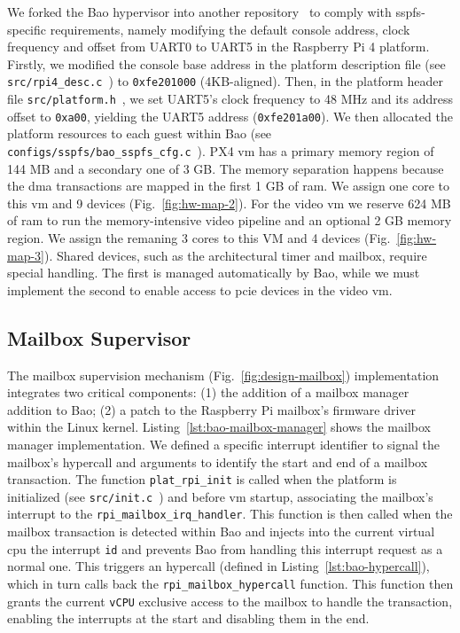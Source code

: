 We forked the Bao hypervisor into another repository~\cite{baoRepo-mine} to comply with
\gls{sspfs}-specific requirements, namely modifying the default console address,
clock frequency and offset from UART0 to UART5 in the Raspberry Pi 4 platform.
Firstly, we modified the console base address in the platform description file
(see \lstinline{src/rpi4_desc.c}~\cite{thesis-sw-github}) to
\lstinline{0xfe201000} (4KB-aligned). Then, in the platform header file \lstinline{src/platform.h}~\cite{thesis-sw-github}, we set UART5's clock frequency to 48
MHz and its address offset to \lstinline{0xa00}, yielding the UART5 address
(\lstinline{0xfe201a00}).
We then allocated the platform resources to each guest within Bao (see
\lstinline{configs/sspfs/bao_sspfs_cfg.c}~\cite{thesis-sw-github}). PX4 \gls{vm}
has a primary memory region of 144 MB and a secondary one of 3 GB. The memory
separation happens because the \gls{dma} transactions are mapped in the first 1
GB of \gls{ram}. We assign one core to this \gls{vm} and 9 devices
(Fig.~\ref{fig:hw-map-2}). For the video \gls{vm} we reserve 624 MB of \gls{ram}
to run the memory-intensive video pipeline and an optional 2 GB memory
region. We assign the remaning 3 cores to this VM and 4 devices
(Fig.~\ref{fig:hw-map-3}).
Shared devices, such as the architectural timer and mailbox, require special
handling. The first is managed automatically by Bao, while we must implement the
second to enable access to \gls{pcie} devices in the video \gls{vm}.

\subsection{Mailbox Supervisor}
The mailbox supervision mechanism (Fig.~\ref{fig:design-mailbox}) implementation
integrates two critical components: (1) the addition of a mailbox manager
addition to Bao; (2) a patch to the Raspberry Pi mailbox's firmware driver
within the Linux kernel.
Listing~\ref{lst:bao-mailbox-manager} shows the mailbox manager implementation.
We defined a specific interrupt identifier to signal the mailbox's hypercall
and arguments to identify the start and end of a mailbox transaction. The
function \lstinline{plat_rpi_init} is called when the platform is initialized
(see \lstinline{src/init.c}~\cite{thesis-sw-github}) and before \gls{vm}
startup, associating the mailbox's interrupt to the
\lstinline{rpi_mailbox_irq_handler}. This function is then called when the
mailbox transaction is detected within Bao and injects into the current virtual
\gls{cpu} the interrupt \lstinline{id} and prevents Bao from handling this
interrupt request as a normal one. This triggers an hypercall (defined in
Listing~\ref{lst:bao-hypercall}), which in turn calls back the \lstinline{rpi_mailbox_hypercall}
function. This function then grants the current \lstinline{vCPU} exclusive access to the mailbox to handle the transaction, enabling the interrupts at the
start and disabling them in the end.

